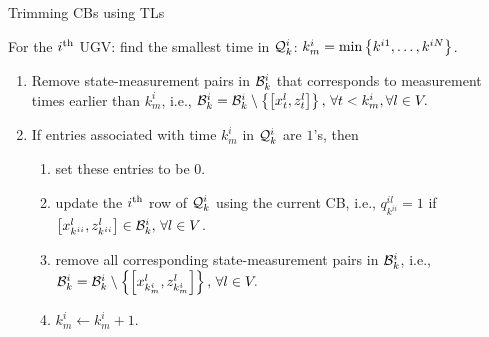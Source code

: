 	
	\begin{algorithm}
		\caption{Trimming CBs using TLs}
		\label{alg:tracklist}
		\begin{algorithmic}
			\State 
			For the $i^\text{th}$ UGV:			
			find the smallest time in $\mathcal{Q}^i_k$: $k^i_m=\min\left\lbrace k^{i1},\dots,k^{iN} \right\rbrace$. 
			\begin{enumerate}
				\item Remove state-measurement pairs in $\mathcal{B}^i_k$ that corresponds to measurement times earlier than $k^i_m$, i.e., $\mathcal{B}^i_k=\mathcal{B}^i_k\setminus \left\lbrace\left[x^l_t,z^l_t\right] \right\rbrace,\,\forall t< k^i_m, \forall l\in V.$
				\item If entries associated with time $k^i_m$ in $\mathcal{Q}^i_k$ are $1$'s, then 
				\begin{enumerate}
					\item set these entries to be $0$.
					\item update the $i^\text{th}$ row of $\mathcal{Q}^i_k$ using the current CB, \textcolor{\revcol}{i.e., $q^{il}_{k^{ii}}=1$ if $\left[x^l_{k^{ii}},z^l_{k^{ii}}\right]\in \mathcal{B}^i_k,\,\forall l\in V$.}
					\item remove all corresponding state-measurement pairs in $\mathcal{B}^i_k$, i.e., $\mathcal{B}^i_k=\mathcal{B}^i_k\setminus \left\lbrace\left[x^l_{k^i_m},z^l_{k^i_m}\right] \right\rbrace,\, \forall l\in V.$
					\item $k^i_m \leftarrow k^i_m+1.$
				\end{enumerate}	
			\end{enumerate}				
		\end{algorithmic}
	\end{algorithm}
	
